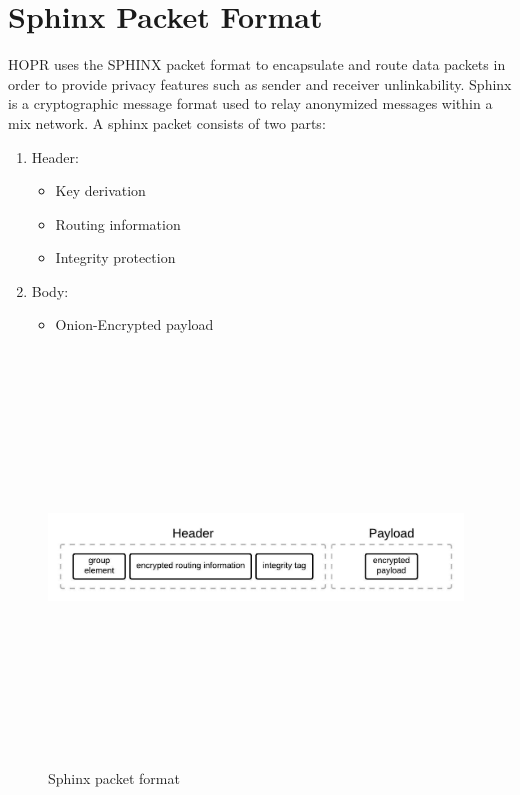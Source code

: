 \section{Sphinx Packet Format}

HOPR uses the SPHINX packet format to encapsulate and route data packets in order to provide privacy features such as sender and receiver unlinkability.
Sphinx is a cryptographic message format used to relay anonymized messages within a mix network. A sphinx packet consists of two parts:

\begin{enumerate}
\item Header:
\begin{itemize}
\item Key derivation
\item Routing information
\item Integrity protection
\end{itemize}
\item Body:
\begin{itemize}
\item Onion-Encrypted payload
\end{itemize}
\end{enumerate}
\begin{figure}[H]
    \centering
    \includegraphics[width=11cm,height=11cm,keepaspectratio]{../whitepaper/images/sphinx.jpeg}
    \caption{Sphinx packet format}
    \label{fig:Sphinx packet format}
\end{figure}
